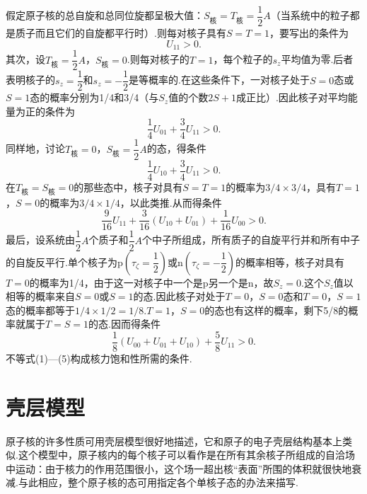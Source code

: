 \begin{xiti}
假定原子核的总自旋和总同位旋都呈极大值：$S_{\text{核}}=T_{\text{核}}=\dfrac{1}{2}A$（当系统中的粒子都是质子而且它们的自旋都平行时）.则每对核子具有$S=T=1$，要写出的条件为
\begin{equation}
  U_{11}>0.
\end{equation}
其次，设$T_{\text{核}}=\dfrac{1}{2}A$，$S_{\text{核}}=0$.则每对核子的$T=1$，每个粒子的$s_z$平均值为零.后者表明核子的$s_z=\dfrac{1}{2}$和$s_z=-\dfrac{1}{2}$是等概率的.在这些条件下，一对核子处于$S=0$态或$S=1$态的概率分别为1/4和3/4（与$S_z$值的个数$2S+1$成正比）.因此核子对平均能量为正的条件为
\begin{equation}
  \frac{1}{4}U_{01}+\frac{3}{4}U_{11}>0.
\end{equation}
同样地，讨论$T_{\text{核}}=0$，$S_{\text{核}}=\dfrac{1}{2}A$的态，得条件
\begin{equation}
  \frac{1}{4}U_{10}+\frac{3}{4}U_{11}>0.
\end{equation}
在$T_{\text{核}}=S_{\text{核}}=0$的那些态中，核子对具有$S=T=1$的概率为$3/4\times3/4$，具有$T=1$，$S=0$的概率为$3/4\times1/4$，以此类推.从而得条件
\begin{equation}
  \frac{9}{16}U_{11}+\frac{3}{16}\left(U_{10}+U_{01}\right)+\frac{1}{16}U_{00}>0.
\end{equation}
最后，设系统由$\dfrac{1}{2}A$个质子和$\dfrac{1}{2}A$个中子所组成，所有质子的自旋平行并和所有中子的自旋反平行.单个核子为$\mathrm{p}\left(\tau_\zeta=\dfrac{1}{2}\right)$或$\mathrm{n}\left(\tau_\zeta=-\dfrac{1}{2}\right)$的概率相等，核子对具有$T=0$的概率为1/4，由于这一对核子中一个是p另一个是n，故$S_z=0$.这个$S_z$值以相等的概率来自$S=0$或$S=1$的态.因此核子对处于$T=0$，$S=0$态和$T=0$，$S=1$态的概率都等于$1/4\times1/2=1/8$.$T=1$，$S=0$的态也有这样的概率，剩下5/8的概率就属于$T=S=1$的态.因而得条件
\begin{equation}
  \frac{1}{8}\left(U_{00}+U_{01}+U_{10}\right)+\frac{5}{8}U_{11}>0.
\end{equation}
不等式(1)---(5)构成核力饱和性所需的条件.

\end{xiti}
\renewcommand{\theequation}{\arabic{section}.\arabic{equation}}%

\section{壳层模型}

原子核的许多性质可用壳层模型很好地描述，它和原子的电子壳层结构基本上类似.这个模型中，原子核内的每个核子可以看作是在所有其余核子所组成的自洽场中运动：由于核力的作用范围很小，这个场一超出核“表面”所围的体积就很快地衰减.与此相应，整个原子核的态可用指定各个单核子态的办法来描写.

